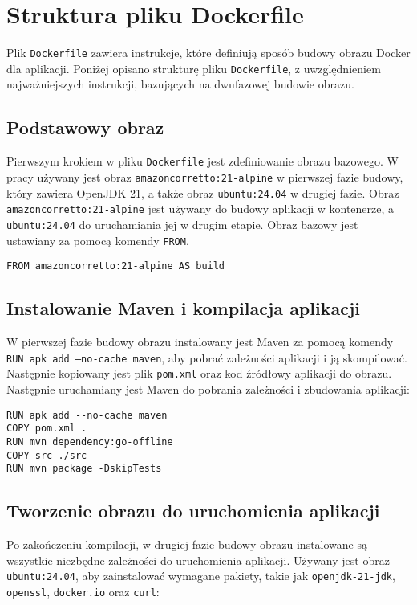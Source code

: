 \section{Struktura pliku Dockerfile}

Plik \texttt{Dockerfile} zawiera instrukcje, które definiują sposób budowy obrazu Docker dla aplikacji. Poniżej opisano strukturę pliku \texttt{Dockerfile}, z uwzględnieniem najważniejszych instrukcji, bazujących na dwufazowej budowie obrazu.

\subsection{Podstawowy obraz}

Pierwszym krokiem w pliku \texttt{Dockerfile} jest zdefiniowanie obrazu bazowego. W pracy używany jest obraz \texttt{amazoncorretto:21-alpine} w pierwszej fazie budowy, który zawiera OpenJDK 21, a także obraz \texttt{ubuntu:24.04} w drugiej fazie. Obraz \texttt{amazoncorretto:21-alpine} jest używany do budowy aplikacji w kontenerze, a \texttt{ubuntu:24.04} do uruchamiania jej w drugim etapie. Obraz bazowy jest ustawiany za pomocą komendy \texttt{FROM}.

\begin{verbatim}
FROM amazoncorretto:21-alpine AS build
\end{verbatim}

\subsection{Instalowanie Maven i kompilacja aplikacji}

W pierwszej fazie budowy obrazu instalowany jest Maven za pomocą komendy \texttt{RUN apk add --no-cache maven}, aby pobrać zależności aplikacji i ją skompilować. Następnie kopiowany jest plik \texttt{pom.xml} oraz kod źródłowy aplikacji do obrazu. Następnie uruchamiany jest Maven do pobrania zależności i zbudowania aplikacji:

\begin{verbatim}
RUN apk add --no-cache maven
COPY pom.xml .
RUN mvn dependency:go-offline
COPY src ./src
RUN mvn package -DskipTests
\end{verbatim}

\subsection{Tworzenie obrazu do uruchomienia aplikacji}

Po zakończeniu kompilacji, w drugiej fazie budowy obrazu instalowane są wszystkie niezbędne zależności do uruchomienia aplikacji. Używany jest obraz \texttt{ubuntu:24.04}, aby zainstalować wymagane pakiety, takie jak \texttt{openjdk-21-jdk}, \texttt{openssl}, \texttt{docker.io} oraz \texttt{curl}:

